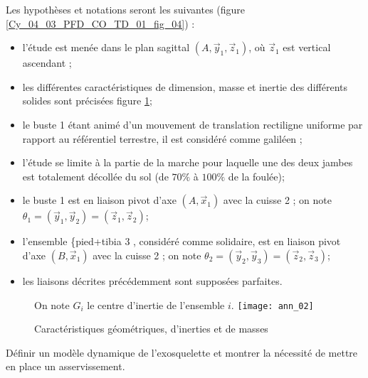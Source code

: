 Les hypothèses et notations seront les suivantes (figure \ref{Cy_04_03_PFD_CO_TD_01_fig_04}) :
\begin{itemize}
  \item l'étude est menée dans le plan sagittal $\left(A, \vec{y}_{1}, \vec{z}_{1}\right)$, où $\vec{z}_{1}$ est vertical ascendant ;
  \item les différentes caractéristiques de dimension, masse et inertie des différents solides sont précisées figure  \ref{Cy_04_03_PFD_CO_TD_01_ann_02};
  \item le buste 1 étant animé d'un mouvement de translation rectiligne uniforme par rapport au référentiel terrestre, il est considéré comme galiléen ;
  \item l'étude se limite à la partie de la marche pour laquelle une des deux jambes est totalement décollée du sol (de $70 \%$ à $100 \%$ de la foulée);%
  \item le buste 1 est en liaison pivot d'axe $\left(A, \vec{x}_{1}\right)$ avec la cuisse 2 ; on note $\theta_{1}=\left(\vec{y}_{1}, \vec{y}_{2}\right)=\left(\vec{z}_{1}, \vec{z}_{2}\right)$;
  \item l'ensemble \{pied+tibia 3 , considéré comme solidaire, est en liaison pivot d'axe $\left(B, \vec{x}_{1}\right)$ avec la cuisse 2 ; on note $\theta_{2}=\left(\vec{y}_{2}, \vec{y}_{3}\right)=\left(\vec{z}_{2}, \vec{z}_{3}\right)$;
  \item les liaisons décrites précédemment sont supposées parfaites.
\end{itemize}


\begin{figure}[!h]
 On note $G_i$ le centre d'inertie de l'ensemble $i$.
\texttt{[image: ann\_02]}

\caption{Caractéristiques géométriques, d’inerties et de masses \label{Cy_04_03_PFD_CO_TD_01_ann_02}}
\end{figure}

\begin{obj}
Définir un modèle dynamique de l’exosquelette et montrer la nécessité de mettre en place un asservissement.
\end{obj}

